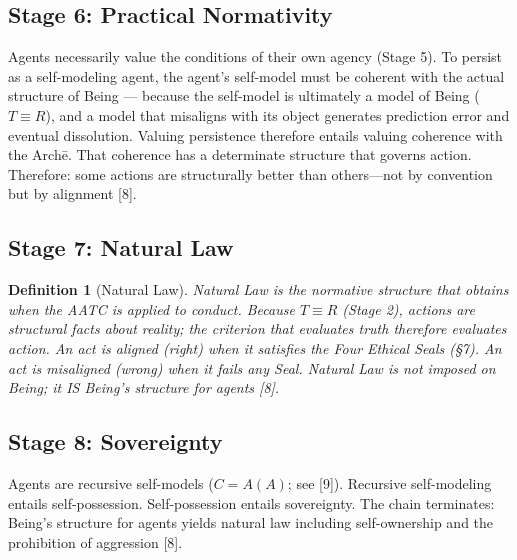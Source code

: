 \documentclass[12pt, letterpaper]{article}
\newtheorem{definition}{Definition}[section]
\begin{document}
\subsection{Stage 6: Practical Normativity}

Agents necessarily value the conditions of their own agency (Stage 5). To persist as a self-modeling agent, the agent's self-model must be coherent with the actual structure of Being --- because the self-model is ultimately a model of Being ($T \equiv R$), and a model that misaligns with its object generates prediction error and eventual dissolution. Valuing persistence therefore entails valuing coherence with the Arch\={e}. That coherence has a determinate structure that governs action. Therefore: some actions are structurally better than others---not by convention but by alignment [8].

\subsection{Stage 7: Natural Law}

\begin{definition}[Natural Law]
\label{def:natlaw}
Natural Law is the normative structure that obtains when the AATC is applied to conduct. Because $T \equiv R$ (Stage 2), actions are structural facts about reality; the criterion that evaluates truth therefore evaluates action. An act is aligned (right) when it satisfies the Four Ethical Seals (\S7). An act is misaligned (wrong) when it fails any Seal. Natural Law is not imposed on Being; it IS Being's structure for agents [8].
\end{definition}

\subsection{Stage 8: Sovereignty}

Agents are recursive self-models ($C = A(A)$; see [9]). Recursive self-modeling entails self-possession. Self-possession entails sovereignty. The chain terminates: Being's structure for agents yields natural law including self-ownership and the prohibition of aggression [8].

\vspace{1em}
\end{document}
